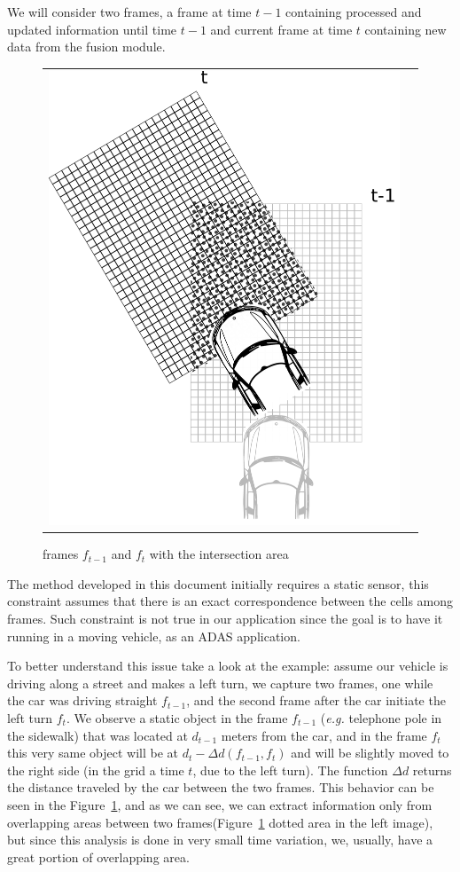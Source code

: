 We will consider two frames, a frame at time $t-1$ containing processed and updated information until time $t-1$ and current frame at time $t$ containing new data from the fusion module.




\begin{figure}[h]
   \centering
     \begin{tabular}{lr}
       \includegraphics[width=0.35\columnwidth]{img/fig:motion:algorithm:nonstatic:01}
     \end{tabular}
   \caption{frames $f_{t-1}$ and $f_{t}$ with the intersection area}
   \label{fig:motion:algorithm:nonstatic:01}
 \end{figure}

The method developed in this document initially requires a static sensor, this constraint assumes that there is an exact correspondence between the cells among frames. Such constraint is not true in our application since the goal is to have it running in a moving vehicle, as an ADAS application. 

To better understand this issue take a look at the example: assume our vehicle is driving along a street and makes a left turn, we capture two frames, one while the car was driving straight $f_{t-1}$, and the second frame  after the car initiate the left turn $f_{t}$. We observe a static object in the frame $f_{t-1}$ (\textit{e.g.} telephone pole in the sidewalk) that was located at $d_{t-1}$ meters from the car, and in the frame $f_{t}$ this very same object will be at $d_t-\Delta d(f_{t-1},f_{t})$ and will be slightly moved to the right side (in the grid a time $t$, due to the left turn). The function $\Delta d$ returns the distance traveled by the car between the two frames. This behavior can be seen in the Figure~\ref{fig:motion:algorithm:nonstatic:01}, and as we can see, we can extract information only from overlapping areas between two frames(Figure~\ref{fig:motion:algorithm:nonstatic:01} dotted area in the left image), but since this analysis is done in very small time variation, we, usually, have a great portion of overlapping area.

